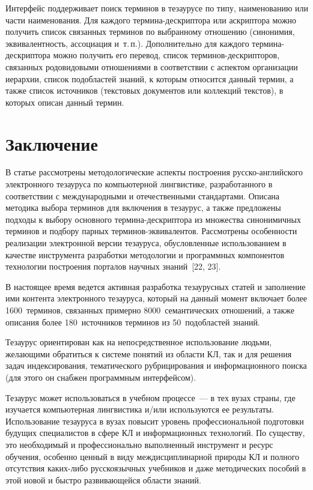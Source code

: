 \begin{multicols}{2}
  Интерфейс поддерживает поиск терминов в тезаурусе по типу, наименованию или части 
наименования. Для каждого термина-дескриптора или аскриптора можно получить список 
связанных терминов по выбранному отношению (синонимия, эквивалентность, ассоциация 
и~т.\,п.). Дополнительно для каждого термина-дескриптора можно получить его перевод, 
список терминов-дескрипторов, связанных родовидовыми отношениями в соответствии с 
аспектом организации иерархии, список подобластей знаний, к которым относится данный 
термин, а также список источников (текстовых документов или коллекций текстов), в 
которых описан данный термин.

\section{Заключение}

  В статье рассмотрены методологические аспекты построения русско-английского 
электронного тезауруса по компьютерной лингвистике, разработанного в соответствии с 
международными и отечественными стандартами. Описана методика выбора терминов для 
включения в тезаурус, а также предложены подходы к выбору основного тер\-ми\-на-де\-скрип\-то\-ра 
из множества синонимичных терминов и подбору парных терминов-эквивалентов. Рассмотрены особенности реализации электронной версии тезауруса, 
обусловленные использованием в качестве инструмента разработки методологии и 
программных компонентов технологии построения порталов научных знаний~[22, 23].
  
  В настоящее время ведется активная разработка тезаурусных статей и заполнение ими 
контента электронного тезауруса, который на данный момент включает более 
1600~терминов, связанных примерно 8000~семантических отношений, а также описания 
более 180~источников терминов из 50~подобластей знаний. 
  
  Тезаурус ориентирован как на непосредственное использование людьми, желающими 
обратиться к системе понятий из области КЛ, так и для решения задач индексирования, 
тематического рубрицирования и информационного поиска (для этого он снабжен 
программным интерфейсом).
  
  Тезаурус может использоваться в учебном процессе~--- в тех вузах страны, где изучается 
компьютерная лингвистика и/или используются ее\linebreak
 результаты. Использование тезауруса в 
вузах повысит уровень профессиональной подготовки будущих специалистов в сфере КЛ и 
информационных технологий. По существу, это необходимый и профессионально 
выполненный инструмент и ресурс обучения, особенно ценный в виду междисциплинарной 
природы КЛ и полного отсутствия каких-либо русскоязычных учебников и даже 
методических пособий в этой новой и быстро развивающейся области знаний.



\end{multicols}
